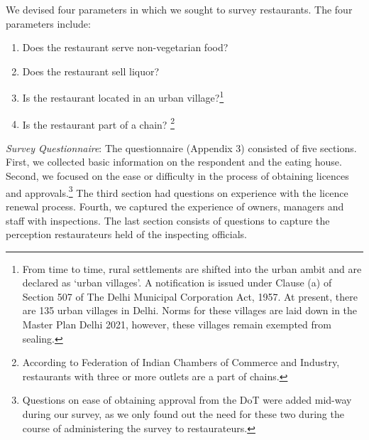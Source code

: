 \documentclass[a4paper, 12pt]{article}
\begin{document}
\begin{enumerate} [A,B,C]
		
		We devised four parameters in which we sought to survey restaurants. The four parameters include:
		\begin{enumerate}
			\item Does the restaurant serve non-vegetarian food?
			\item Does the restaurant sell liquor?
			\item Is the restaurant located in an urban village?\footnote{From time to time, rural settlements are shifted into the urban ambit and are declared as ‘urban villages’. A notification is issued under Clause (a) of Section 507 of The Delhi Municipal Corporation Act, 1957. At present, there are 135 urban villages in Delhi. Norms for these villages are laid down in the Master Plan Delhi 2021, however, these villages remain exempted from sealing.} 
			\item Is the restaurant part of a chain? \footnote{According to Federation of Indian Chambers of Commerce and Industry, restaurants with three or more outlets are a part of chains.}
		\end{enumerate}


		\textit{Survey Questionnaire}: The questionnaire (Appendix 3) consisted of five sections. First, we collected basic information on the respondent and the eating house. Second, we focused on the ease or difficulty in the process of obtaining licences and approvals.\footnote{Questions on ease of obtaining approval from the DoT were added mid-way during our survey, as we only found out the need for these two during the course of administering the survey to restaurateurs.} The third section had questions on experience with the licence renewal process. Fourth, we captured the experience of owners, managers and staff with inspections. The last section consists of questions to capture the perception restaurateurs held of the inspecting officials.\\


\end{enumerate}
\end{document}
